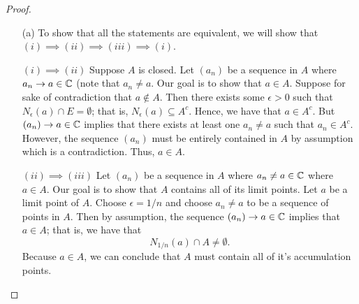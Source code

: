\documentclass[a4paper]{article}
\begin{document}
\begin{proof}
\begin{enumerate}
    \item[(a)] To show that all the statements are equivalent, we will show that \( (i) \implies (ii) \implies (iii) \implies (i) \).  

        \( (i) \implies (ii) \) Suppose \( A  \) is closed. Let \( ({a}_{n}) \) be a sequence in \( A  \) where \( {a}_{n} \to a \in \mathbb{C}  \) (note that \( {a}_{n} \neq a  \). Our goal is to show that \( a \in A  \). Suppose for sake of contradiction that \( a \notin A  \). Then there exists some \( \epsilon > 0  \) such that \( {N}_{\epsilon}(a) \cap E = \emptyset  \); that is, \( {N}_{\epsilon}(a) \subseteq A^{c} \). Hence, we have that \( a \in A^{c} \). But \( ({a}_{n}) \to a \in \mathbb{C}  \) implies that there exists at least one \( {a}_{n} \neq a   \) such that \( {a}_{n} \in A^{c} \). However, the sequence \( ({a}_{n}) \) must be entirely contained in \( A  \) by assumption which is a contradiction. Thus, \( a \in A   \).

        \( (ii) \implies (iii) \) Let \( ({a}_{n}) \) be a sequence in \( A  \) where \( {a}_{n} \neq a \in \mathbb{C}  \) where \( a \in A  \). Our goal is to show that \( A  \) contains all of its limit points. Let \( a  \) be a limit point of \( A  \). Choose \( \epsilon = 1/n \) and choose \( {a}_{n} \neq a  \) to be a sequence of points in \( A  \). Then by assumption, the sequence \( ({a}_{n}) \to a \in \mathbb{C}   \) implies that \( a \in A  \); that is, we have that 
        \[  {N}_{1/n}(a) \cap A  \neq \emptyset.   \]
        Because \( a \in A  \), we can conclude that \( A  \) must contain all of it's accumulation points.
       

\end{enumerate}
\end{proof}
\end{document}
